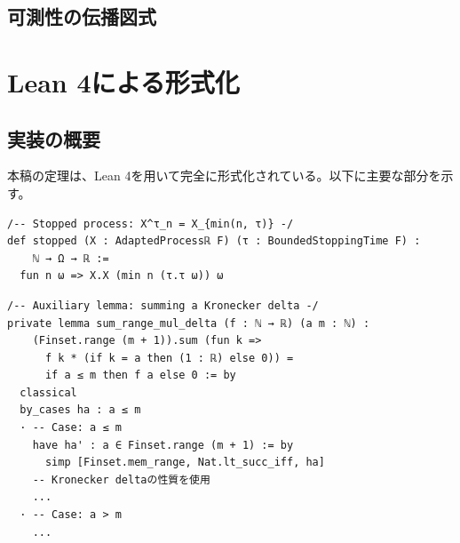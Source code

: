 \documentclass[a4paper,12pt]{ltjsarticle}
\theoremstyle{definition}
\begin{document}
\subsection{可測性の伝播図式}

\begin{center}
\end{center}

\section{Lean 4による形式化}

\subsection{実装の概要}

本稿の定理は、Lean 4を用いて完全に形式化されている。以下に主要な部分を示す。

\begin{lstlisting}[style=lean, caption=停止過程の定義]
/-- Stopped process: X^τ_n = X_{min(n, τ)} -/
def stopped (X : AdaptedProcessℝ F) (τ : BoundedStoppingTime F) :
    ℕ → Ω → ℝ :=
  fun n ω => X.X (min n (τ.τ ω)) ω
\end{lstlisting}

\begin{lstlisting}[style=lean, caption=Kronecker デルタの補題]
/-- Auxiliary lemma: summing a Kronecker delta -/
private lemma sum_range_mul_delta (f : ℕ → ℝ) (a m : ℕ) :
    (Finset.range (m + 1)).sum (fun k =>
      f k * (if k = a then (1 : ℝ) else 0)) =
      if a ≤ m then f a else 0 := by
  classical
  by_cases ha : a ≤ m
  · -- Case: a ≤ m
    have ha' : a ∈ Finset.range (m + 1) := by
      simp [Finset.mem_range, Nat.lt_succ_iff, ha]
    -- Kronecker deltaの性質を使用
    ...
  · -- Case: a > m
    ...
\end{lstlisting}
\end{document}
